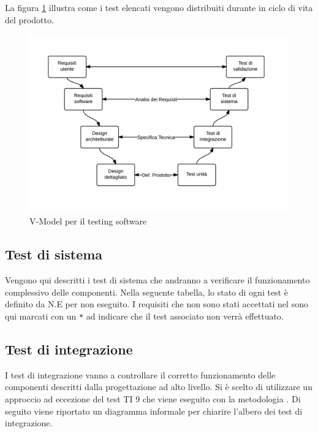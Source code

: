 	La figura \ref{fig:V-Model} illustra come i test elencati vengono distribuiti durante in ciclo di vita del prodotto.

	\begin{figure}[H]
	\centering \includegraphics[width=1\textwidth]{V-Model.png}
	\caption{V-Model per il testing software}
	\label{fig:V-Model}
	\end{figure}

	\subsection{Test di sistema}
	Vengono qui descritti i test di sistema che andranno a verificare il funzionamento complessivo delle componenti.
	Nella seguente tabella, lo stato di ogni test è definito da N.E per non eseguito. I requisiti che non sono stati accettati nel \AnalisiDeiRequisiti{} sono qui marcati con un \texttt{*} ad indicare che il test associato non verrà effettuato.
	
	
	
	\subsection{Test di integrazione}
	I test di integrazione vanno a controllare il corretto funzionamento delle componenti descritti dalla progettazione ad alto livello. Si è scelto di utilizzare un approccio  ad eccezione del test TI 9 che viene eseguito con la metodologia . Di seguito viene riportato un diagramma informale per chiarire l'albero dei test di integrazione.

